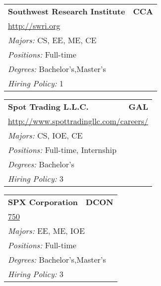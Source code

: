 \documentclass[twoside]{article}
\begin{document}
\begin{center}
\begin{multicols}{3}
\begin{FlushLeft}
\begin{minipage}{\columnwidth}
\end{minipage}
 
\begin{minipage}{\columnwidth}\begin{tabularx}{.95\columnwidth}{Xr}
                 {\Large\bf Southwest Research Institute} & {\Large\bf CCA}\\
    \multicolumn{2}{p{.95\columnwidth}}{\url{http://swri.org}}\\
    \multicolumn{2}{p{.95\columnwidth}}{\emph{Majors:} CS, EE, ME, CE}\\
    \multicolumn{2}{p{.95\columnwidth}}{\emph{Positions:} Full-time}\\
    \multicolumn{2}{p{.95\columnwidth}}{\emph{Degrees:} Bachelor's,Master's}\\
    \multicolumn{2}{p{.95\columnwidth}}{\emph{Hiring Policy:} 1}\\
    \end{tabularx}
    
\end{minipage}
 
\begin{minipage}{\columnwidth}\begin{tabularx}{.95\columnwidth}{Xr}
                 {\Large\bf Spot Trading L.L.C.} & {\Large\bf GAL}\\
    \multicolumn{2}{p{.95\columnwidth}}{\url{http://www.spottradingllc.com/careers/}}\\
    \multicolumn{2}{p{.95\columnwidth}}{\emph{Majors:} CS, IOE, CE}\\
    \multicolumn{2}{p{.95\columnwidth}}{\emph{Positions:} Full-time, Internship}\\
    \multicolumn{2}{p{.95\columnwidth}}{\emph{Degrees:} Bachelor's}\\
    \multicolumn{2}{p{.95\columnwidth}}{\emph{Hiring Policy:} 3}\\
    \end{tabularx}
    
\end{minipage}
 
\begin{minipage}{\columnwidth}\begin{tabularx}{.95\columnwidth}{Xr}
                 {\Large\bf SPX Corporation} & {\Large\bf DCON}\\
    \multicolumn{2}{p{.95\columnwidth}}{\url{750}}\\
    \multicolumn{2}{p{.95\columnwidth}}{\emph{Majors:} EE, ME, IOE}\\
    \multicolumn{2}{p{.95\columnwidth}}{\emph{Positions:} Full-time}\\
    \multicolumn{2}{p{.95\columnwidth}}{\emph{Degrees:} Bachelor's,Master's}\\
    \multicolumn{2}{p{.95\columnwidth}}{\emph{Hiring Policy:} 3}\\
    \end{tabularx}
    

\end{minipage}
\end{FlushLeft}
\end{multicols}
\end{center}
\end{document}
